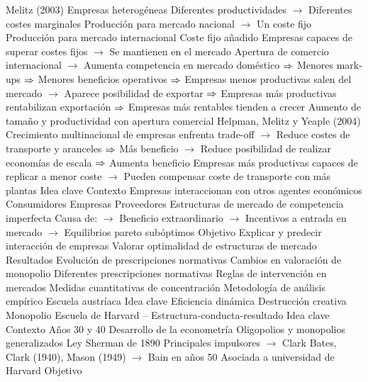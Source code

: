 \documentclass{nuevotema}
\begin{document}
\begin{esquemal}
				\4 Melitz (2003)
				\4[] Empresas heterogéneas
				\4[] Diferentes productividades
				\4[] $\to$ Diferentes costes marginales
				\4[] Producción para mercado nacional
				\4[] $\to$ Un coste fijo
				\4[] Producción para mercado internacional
				\4[] Coste fijo añadido
				\4[] Empresas capaces de superar costes fijos
				\4[] $\to$ Se mantienen en el mercado
				\4[] Apertura de comercio internacional
				\4[] $\to$ Aumenta competencia en mercado doméstico
				\4[] $\then$ Menores mark-ups
				\4[] $\then$ Menores beneficios operativos
				\4[] $\then$ Empresas menos productivas salen del mercado
				\4[] $\to$ Aparece posibilidad de exportar
				\4[] $\then$ Empresas más productivas rentabilizan exportación
				\4[] $\then$ Empresas más rentables tienden a crecer
				\4[$\then$] Aumento de tamaño y productividad con apertura comercial
				\4 Helpman, Melitz y Yeaple (2004)
				\4[] Crecimiento multinacional de empresas enfrenta trade-off
				\4[] $\to$ Reduce costes de transporte y aranceles
				\4[] $\then$ Más beneficio
				\4[] $\to$ Reduce posibilidad de realizar economías de escala
				\4[] $\then$ Aumenta beneficio
				\4[] Empresas más productivas capaces de replicar a menor coste
				\4[] $\to$ Pueden compensar coste de transporte con más plantas
	\1 
		\2 Idea clave
			\3 Contexto
				\4 Empresas interaccionan con otros agentes económicos
				\4[] Consumidores
				\4[] Empresas
				\4[] Proveedores
				\4 Estructuras de mercado de competencia imperfecta
				\4[] Causa de:
				\4[] $\to$ Beneficio extraordinario
				\4[] $\to$ Incentivos a entrada en mercado
				\4[] $\to$ Equilibrios pareto subóptimos
			\3 Objetivo
				\4 Explicar y predecir interacción de empresas
				\4 Valorar optimalidad de estructuras de mercado
			\3 Resultados
				\4 Evolución de prescripciones normativas
				\4 Cambios en valoración de monopolio
				\4[] Diferentes prescripciones normativas
				\4 Reglas de intervención en mercados
				\4 Medidas cuantitativas de concentración
				\4 Metodología de análisis empírico
		\2 Escuela austríaca
			\3 Idea clave
			\3 Eficiencia dinámica
			\3 Destrucción creativa
			\3 Monopolio
		\2 Escuela de Harvard -- Estructura-conducta-resultado
			\3 Idea clave
				\4 Contexto
				\4[] Años 30 y 40
				\4[] Desarrollo de la econometría
				\4[] Oligopolios y monopolios generalizados
				\4[] Ley Sherman de 1890
				\4[] Principales impulsores
				\4[] $\to$ Clark Bates, Clark (1940), Mason (1949)
				\4[] $\to$ Bain en años 50
				\4[] Asociada a universidad de Harvard
				\4 Objetivo

\end{esquemal}
\end{document}
